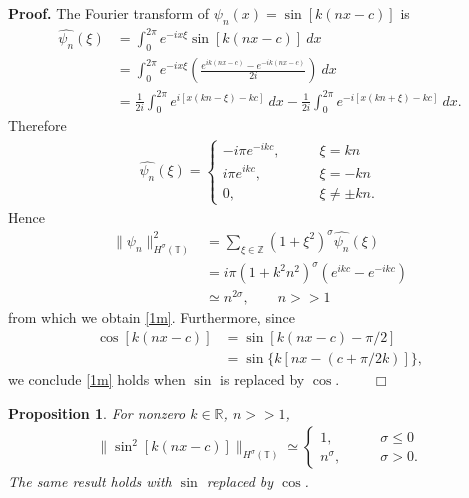 \documentclass[12pt,reqno]{amsart}
\newcommand{\rr}{\mathbb{R}}
\newcommand{\zz}{\mathbb{Z}}
\newcommand{\ci}{\mathbb{T}}
\theoremstyle{plain}  %
\newtheorem{proposition}{Proposition}
\theoremstyle{definition}
\begin{document}
		{\bf Proof.} The Fourier transform of $\psi_n(x) = \sin[k(nx-c)]$
		is
		\begin{equation*}
			\begin{split}
				\widehat{\psi_n}(\xi)
				& = \int_0^{2\pi} e^{-ix \xi} \sin [k(nx-c)]
				\ dx
				\\
				& = \int_0^{2\pi} e^{-ix \xi} \left( \frac{e^{ik(nx-c)} -
				e^{-ik(nx-c)}}{2i} \right) \ dx
				\\
				& = \frac{1}{2i} \int_0^{2\pi} e^{i[x(kn- \xi)-kc]} \ dx
				- \frac{1}{2i}\int_0^{2\pi} e^{-i[x(kn+\xi) - kc]} \ dx.
			\end{split}
		\end{equation*}
		Therefore
		\begin{equation*}
			\begin{split}
				\widehat{\psi_n}(\xi) =
				\begin{cases}
					- i \pi e^{-ikc}, \qquad & \xi = kn\\
					i \pi e^{ikc}, \qquad & \xi = -kn\\
					0,  \qquad & \xi \neq \pm kn.
				\end{cases}
			\end{split}
		\end{equation*}
		Hence
		\begin{equation*}
			\begin{split}
				\|\psi_n\|_{H^\sigma(\ci)}^2
				& = \sum_{\xi \in \zz}
				(1+\xi^2)^{\sigma} \widehat{\psi_n}(\xi) 
				\\
				& = i \pi (1+k^2 n^2)^{\sigma} (e^{ikc} - e^{-ikc})
				\\
				& \simeq n^{2 \sigma}, \qquad n>>1
			\end{split}
		\end{equation*}
		from which we obtain \eqref{1m}. Furthermore, since
		\begin{equation*}
			\begin{split}
				\cos[k(nx-c)]
				&= \sin[k(nx-c)- \pi/2] \\
				& = \sin\{k[nx - (c + \pi/2k)]\},
			\end{split}
		\end{equation*}
		we conclude \eqref{1m} holds when $\sin$ is replaced by $\cos$.
		$\qquad \Box$
		\begin{proposition}
			\label{2n}
			For nonzero $k \in \rr$, $n >>1$,
			\begin{equation}
				\label{2m}
				\begin{split}
					\|\sin^2[k(nx-c)] \|_{H^\sigma(\ci)} \simeq
					\begin{cases}
					1, \qquad & \sigma \le 0
					\\
					n^\sigma,\qquad &\sigma > 0.
				\end{cases}
				\end{split}
			\end{equation}
			The same result holds with $\sin$ replaced by $\cos$.
		\end{proposition}
\end{document}
